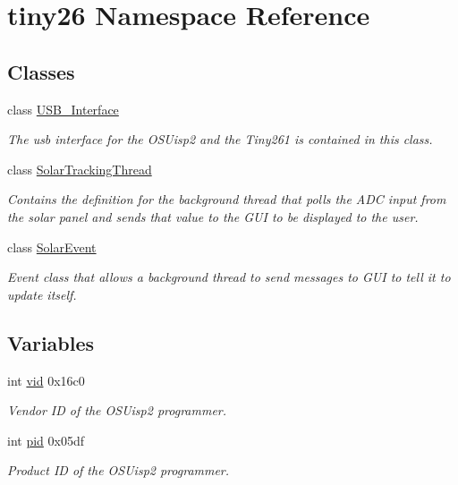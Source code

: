 \hypertarget{namespacetiny26}{\section{tiny26 Namespace Reference}
\label{namespacetiny26}
}
\subsection*{Classes}
\begin{DoxyCompactItemize}
\item 
class \hyperlink{classtiny26_1_1_u_s_b___interface}{U\-S\-B\-\_\-\-Interface}
\begin{DoxyCompactList}\small\item\em The usb interface for the O\-S\-Uisp2 and the Tiny261 is contained in this class. \end{DoxyCompactList}\item 
class \hyperlink{classtiny26_1_1_solar_tracking_thread}{Solar\-Tracking\-Thread}
\begin{DoxyCompactList}\small\item\em Contains the definition for the background thread that polls the A\-D\-C input from the solar panel and sends that value to the G\-U\-I to be displayed to the user. \end{DoxyCompactList}\item 
class \hyperlink{classtiny26_1_1_solar_event}{Solar\-Event}
\begin{DoxyCompactList}\small\item\em Event class that allows a background thread to send messages to G\-U\-I to tell it to update itself. \end{DoxyCompactList}\end{DoxyCompactItemize}
\subsection*{Variables}
\begin{DoxyCompactItemize}
\item 
int \hyperlink{namespacetiny26_abc82c52a7ef052100f1d62dd9513dde2}{vid} 0x16c0
\begin{DoxyCompactList}\small\item\em Vendor I\-D of the O\-S\-Uisp2 programmer. \end{DoxyCompactList}\item 
\hypertarget{namespacetiny26_a01d4b1912be2d083b56f6076ef877fa0}{int \hyperlink{namespacetiny26_a01d4b1912be2d083b56f6076ef877fa0}{pid} 0x05df}\label{namespacetiny26_a01d4b1912be2d083b56f6076ef877fa0}

\begin{DoxyCompactList}\small\item\em Product I\-D of the O\-S\-Uisp2 programmer. \end{DoxyCompactList}\end{DoxyCompactItemize}


